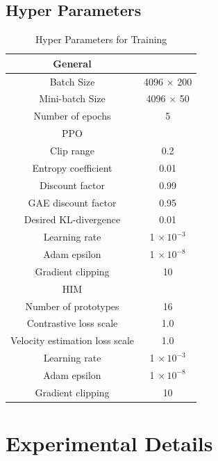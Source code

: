 \subsection{Hyper Parameters}
\label{app:hyper}
\begin{table}[H]
\centering
\caption{Hyper Parameters for Training}
\begin{tabular}{@{}cc@{}}
\toprule[1.5pt]
General                          &              \\ \midrule[1.5pt]
Batch   Size                     & 4096 $\times$ 200 \\
Mini-batch   Size                & 4096 $\times$ 50  \\
Number   of epochs               & 5            \\ \midrule[1.5pt]
PPO                              &              \\ \midrule[1.5pt]
Clip   range                     & 0.2          \\
Entropy   coefficient            & 0.01         \\
Discount   factor                & 0.99         \\
GAE   discount factor            & 0.95         \\
Desired   KL-divergence          & 0.01         \\
Learning   rate                  & 1 $\times \, 10^{-3}$         \\
Adam   epsilon                   & 1 $\times \, 10^{-8}$         \\
Gradient   clipping              & 10           \\ \midrule[1.5pt]
HIM                              &              \\ \midrule[1.5pt]
Number   of prototypes           & 16           \\
Contrastive   loss scale         & 1.0          \\
Velocity   estimation loss scale & 1.0          \\
Learning   rate                  & 1 $\times \, 10^{-3}$         \\
Adam   epsilon                   & 1 $\times \, 10^{-8}$         \\
Gradient   clipping              & 10           \\ \bottomrule[1.5pt]
\end{tabular}
\end{table}


\newpage
\section{Experimental Details}

